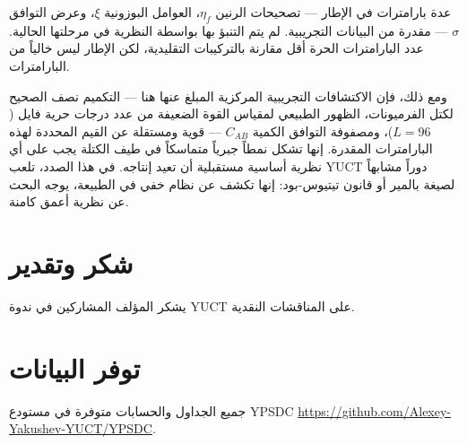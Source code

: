 \documentclass[11pt,a4paper]{article}
\begin{document}
	عدة بارامترات في الإطار — تصحيحات الرنين \(\eta_f\)، العوامل البوزونية \(\xi\)، وعرض التوافق \(\sigma\) — مقدرة من البيانات التجريبية. لم يتم التنبؤ بها بواسطة النظرية في مرحلتها الحالية. عدد البارامترات الحرة أقل مقارنة بالتركيبات التقليدية، لكن الإطار ليس خالياً من البارامترات.
	
	ومع ذلك، فإن الاكتشافات التجريبية المركزية المبلغ عنها هنا — التكميم نصف الصحيح لكتل الفرميونات، الظهور الطبيعي لمقياس القوة الضعيفة من عدد درجات حرية فايل (\(L=96\))، ومصفوفة التوافق الكمية \(C_{AB}\) — قوية ومستقلة عن القيم المحددة لهذه البارامترات المقدرة. إنها تشكل نمطاً جبرياً متماسكاً في طيف الكتلة يجب على أي نظرية أساسية مستقبلية أن تعيد إنتاجه. في هذا الصدد، تلعب YUCT دوراً مشابهاً لصيغة بالمير أو قانون تيتيوس-بود: إنها تكشف عن نظام خفي في الطبيعة، يوجه البحث عن نظرية أعمق كامنة.
	
	\section*{شكر وتقدير}
	يشكر المؤلف المشاركين في ندوة YUCT على المناقشات النقدية.
	
	\section*{توفر البيانات}
	جميع الجداول والحسابات متوفرة في مستودع YPSDC \url{https://github.com/Alexey-Yakushev-YUCT/YPSDC}.
	
\end{document}
